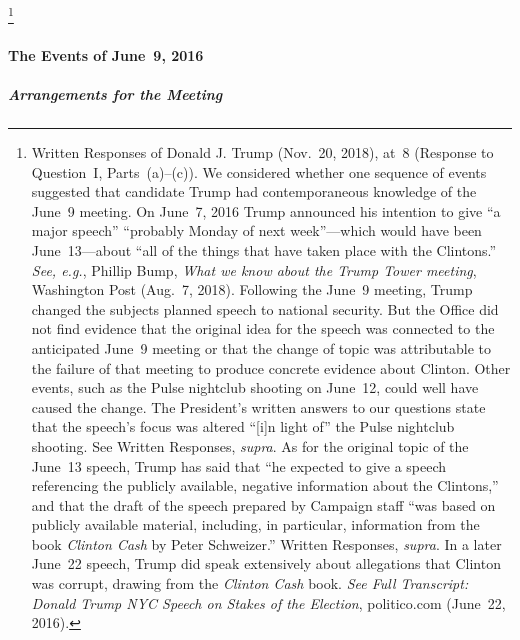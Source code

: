 \footnote{Written Responses of Donald J. Trump (Nov.~20, 2018), at~8 (Response to Question~I, Parts~(a)--(c)).
We considered whether one sequence of events suggested that candidate Trump had contemporaneous knowledge of the June~9 meeting.
On June~7, 2016 Trump announced his intention to give ``a major speech'' ``probably Monday of next week''---which would have been June~13---about ``all of the things that have taken place with the Clintons.''
\textit{See, e.g.}, Phillip Bump, \textit{What we know about the Trump Tower meeting}, Washington Post (Aug.~7, 2018).
Following the June~9 meeting, Trump changed the subjects planned speech to national security.
But the Office did not find evidence that the original idea for the speech was connected to the anticipated June~9 meeting or that the change of topic was attributable to the failure of that meeting to produce concrete evidence about Clinton.
Other events, such as the Pulse nightclub shooting on June~12, could well have caused the change.
The President's written answers to our questions state that the speech's focus was altered ``[i]n light of\thinspace'' the Pulse nightclub shooting.
See Written Responses, \textit{supra}.
As for the original topic of the June~13 speech, Trump has said that ``he expected to give a speech referencing the publicly available, negative information about the Clintons,'' and that the draft of the speech prepared by Campaign staff ``was based on publicly available material, including, in particular, information from the book \textit{Clinton Cash} by Peter Schweizer.''
Written Responses, \textit{supra}.
In a later June~22 speech, Trump did speak extensively about allegations that Clinton was corrupt, drawing from the \textit{Clinton Cash} book.
\textit{See Full Transcript: Donald Trump NYC Speech on Stakes of the Election}, politico.com (June~22, 2016).}

\paragraph{The Events of June~9, 2016}

\subparagraph{Arrangements for the Meeting}

